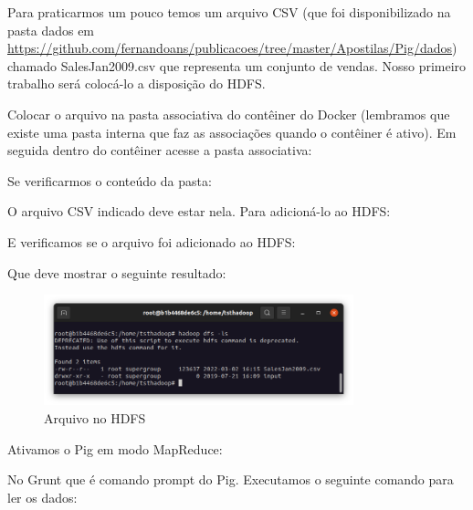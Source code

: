 \documentclass[a4paper,11pt]{article}
\begin{document}
Para praticarmos um pouco temos um arquivo CSV (que foi disponibilizado na pasta dados em \url{https://github.com/fernandoans/publicacoes/tree/master/Apostilas/Pig/dados}) chamado SalesJan2009.csv que representa um conjunto de vendas. Nosso primeiro trabalho será colocá-lo a disposição do HDFS.

Colocar o arquivo na pasta associativa do contêiner do Docker (lembramos que existe uma pasta interna que faz as associações quando o contêiner é ativo). Em seguida dentro do contêiner acesse a pasta associativa: \\

Se verificarmos o conteúdo da pasta: \\

O arquivo CSV indicado deve estar nela. Para adicioná-lo ao HDFS: \\

E verificamos se o arquivo foi adicionado ao HDFS: \\

Que deve mostrar o seguinte resultado:
\begin{figure}[H]
	\centering
	\includegraphics[width=0.8\textwidth]{imagem/listagem}
	\caption{Arquivo no HDFS}
\end{figure}

Ativamos o Pig em modo MapReduce: \\

No Grunt que é comando prompt do Pig. Executamos o seguinte comando para ler os dados: \\
\end{document}
